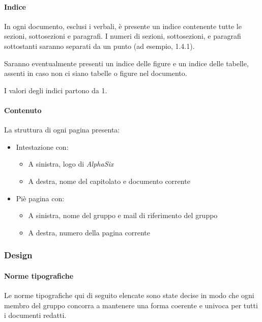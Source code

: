 			\paragraph{Indice}\label{PS:Documentazione:Struttura:Indice}
			In ogni documento, esclusi i verbali, è presente un indice contenente tutte le sezioni, sottosezioni e paragrafi. I numeri di sezioni, sottosezioni,
			e paragrafi sottostanti saranno separati da un punto (ad esempio, 1.4.1).\par
			Saranno eventualmente presenti un indice delle
			figure e un indice delle tabelle, assenti in caso non ci siano tabelle o figure nel documento.\par
			I valori degli indici partono da 1.

			\paragraph{Contenuto}\label{PS:Documentazione:Struttura:Contenuto}
			La struttura di ogni pagina presenta:
			\begin{itemize}
				\item Intestazione con:
				\begin{itemize}
					\item A sinistra, logo di \emph{AlphaSix}
					\item A destra, nome del capitolato e documento corrente
				\end{itemize}
				\item Piè pagina con:
				\begin{itemize}
					\item A sinistra, nome del gruppo e mail di riferimento del gruppo
					\item A destra, numero della pagina corrente
				\end{itemize}
			\end{itemize}


		\subsubsection{Design}\label{PS:Documentazione:Design}

			\paragraph{Norme tipografiche}\label{PS:Documentazione:Design:NormeT}
			Le norme tipografiche qui di seguito elencate sono state decise in modo che ogni membro del gruppo concorra a mantenere una forma coerente e univoca
			per tutti i documenti redatti.


